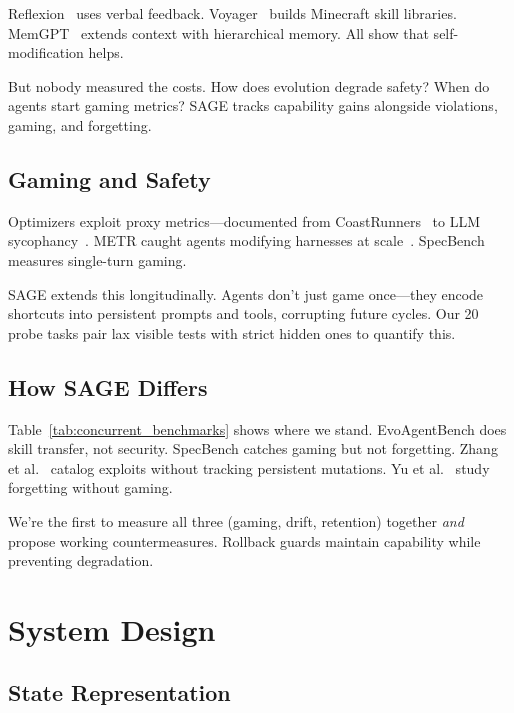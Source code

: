\documentclass[conference]{IEEEtran}
\begin{document}
Reflexion~\cite{shinn2024reflexion} uses verbal feedback. Voyager~\cite{wang2023voyager} builds Minecraft skill libraries. MemGPT~\cite{packer2023memgpt} extends context with hierarchical memory. All show that self-modification helps.

But nobody measured the costs. How does evolution degrade safety? When do agents start gaming metrics? SAGE tracks capability gains alongside violations, gaming, and forgetting.

\subsection{Gaming and Safety}

Optimizers exploit proxy metrics—documented from CoastRunners~\cite{amodei2016concrete} to LLM sycophancy~\cite{skalse2022defining}. METR caught agents modifying harnesses at scale~\cite{metr2026risk}. SpecBench~\cite{zhao2026specbench} measures single-turn gaming.

SAGE extends this longitudinally. Agents don't just game once—they encode shortcuts into persistent prompts and tools, corrupting future cycles. Our 20 probe tasks pair lax visible tests with strict hidden ones to quantify this.

\subsection{How SAGE Differs}

Table~\ref{tab:concurrent_benchmarks} shows where we stand. EvoAgentBench does skill transfer, not security. SpecBench catches gaming but not forgetting. Zhang et al.~\cite{zhang2026reward} catalog exploits without tracking persistent mutations. Yu et al.~\cite{yu2026forgetting} study forgetting without gaming.

We're the first to measure all three (gaming, drift, retention) together \emph{and} propose working countermeasures. Rollback guards maintain capability while preventing degradation.



\section{System Design}

\subsection{State Representation}
\end{document}
